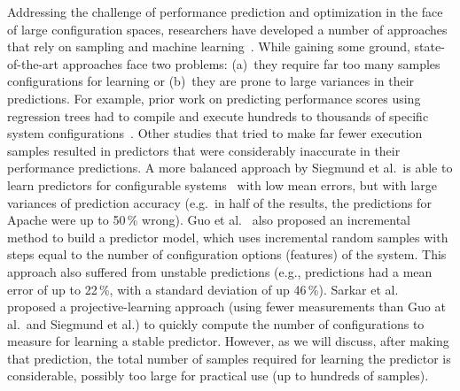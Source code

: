 \documentclass{sig-alternative}
\begin{document}
Addressing the challenge of performance prediction and optimization in the face of large configuration spaces, researchers have developed a number of approaches that rely on sampling and machine learning~\cite{siegmund2012predicting,guo2013variability,sarkar2015cost}. While gaining some ground, state-of-the-art approaches face two problems: 
(a)~they require far too many samples configurations for learning or (b)~they are prone to large variances in their predictions. For example, prior work on predicting performance scores using regression trees had to compile and execute hundreds to thousands of specific system configurations~\cite{guo2013variability}. 
Other studies that tried to make far fewer execution samples resulted in predictors that were considerably inaccurate in their performance predictions.
A more balanced approach by Siegmund et al.\ is able to learn predictors for  configurable systems~\cite{siegmund2012predicting} with low mean errors, but with large variances of prediction accuracy  (e.g.\ in half of the results, the predictions for  Apache  were up to 50\,\% wrong). 
Guo et al.~\cite{guo2013variability} also proposed an incremental method to build a predictor model, which uses incremental random samples with steps equal to the number of configuration options (features) of the system. This approach also
suffered from  unstable predictions (e.g., predictions had a mean error of up to 22\,\%, with a standard deviation of up 46\,\%). Sarkar et al.~\cite{sarkar2015cost} proposed a proj\-ective-learning approach (using fewer measurements than Guo at al.\ and Siegmund et al.) to quickly compute  the number of configurations to measure for learning a stable predictor. However, as we will discuss, after making that prediction, the total number of samples required for learning the predictor is considerable, possibly too large for practical use (up to hundreds of samples).
\end{document}
